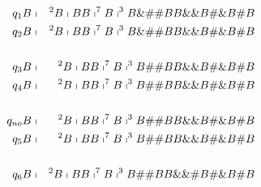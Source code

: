 \begin{frame}
  \begin{eqnarray*}
    q_{1}B &\shortmid &^{2}B\shortmid BB\shortmid ^{7}B\shortmid
    ^{3}B\&\#\#BB\&\&B\#\&B\#B \\
    q_{2}B &\shortmid &^{2}B\shortmid BB\shortmid ^{7}B\shortmid
    ^{3}B\&\#\#BB\&\&B\#\&B\#B \\
    && \\
    q_{3}B &\shortmid &^{2}B\shortmid BB\shortmid ^{7}B\shortmid
    ^{3}B\#\#BB\&\&B\#\&B\#B \\
    q_{4}B &\shortmid &^{2}B\shortmid BB\shortmid ^{7}B\shortmid
    ^{3}B\#\#BB\&\&B\#\&B\#B \\
    && \\
    q_{no}B &\shortmid &^{2}B\shortmid BB\shortmid ^{7}B\shortmid
    ^{3}B\#\#BB\&\&B\#\&B\#B \\
    q_{5}B &\shortmid &^{2}B\shortmid BB\shortmid ^{7}B\shortmid
    ^{3}B\#\#BB\&\&B\#\&B\#B \\
    && \\
    q_{6}B &\shortmid &^{2}B\shortmid BB\shortmid ^{7}B\shortmid
    ^{3}B\#\#BB\&\&\#B\#\&B\#B
  \end{eqnarray*}
\end{frame}
